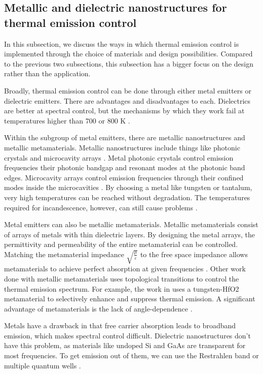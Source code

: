 \documentclass[%
 reprint,
 amsmath,amssymb,
 aps
]{revtex4-2}
\begin{document}
\subsection{Metallic and dielectric nanostructures for thermal emission control}
In this subsection, we discuss the ways in which thermal emission control is implemented through the choice of materials and design possibilities. Compared to the previous two subsections, this subsection has a bigger focus on the design rather than the application.

Broadly, thermal emission control can be done through either metal emitters or dielectric emitters. There are advantages and disadvantages to each. Dielectrics are better at spectral control, but the mechanisms by which they work fail at temperatures higher than 700 or 800 K \cite{nanostructures}.

Within the subgroup of metal emitters, there are metallic nanostructures and metallic metamaterials. Metallic nanostructures include things like photonic crystals \cite{polycrystalline} and microcavity arrays \cite{microcavity}. Metal photonic crystals control emission frequencies their photonic bandgap and resonant modes at the photonic band edges. Microcavity arrays control emission frequencies through their confined modes inside the microcavities \cite{nanostructures}. By choosing a metal like tungsten or tantalum, very high temperatures can be reached without degradation. The temperatures required for incandescence, however, can still cause problems \cite{ilic}.

Metal emitters can also be metallic metamaterials. Metallic metamaterials consist of arrays of metals with thin dielectric layers. By designing the metal arrays, the permittivity and permeability of the entire metamaterial can be controlled. Matching the metamaterial impedance $\sqrt{\frac{\mu}{\varepsilon}}$ to the free space impedance allows metamaterials to achieve perfect absorption at given frequencies \cite{nanostructures}. Other work done with metallic metamaterials uses topological transitions to control the thermal emission spectrum. For example, the work in uses a tungsten-HfO2 metamaterial to selectively enhance and suppress thermal emission. A significant advantage of metamaterials is the lack of angle-dependence \cite{topological}.

Metals have a drawback in that free carrier absorption leads to broadband emission, which makes spectral control difficult. Dielectric nanostructures don't have this problem, as materials like undoped Si and GaAs are transparent for most frequencies. To get emission out of them, we can use the Restrahlen band or multiple quantum wells \cite{nanostructures}.
\end{document}
